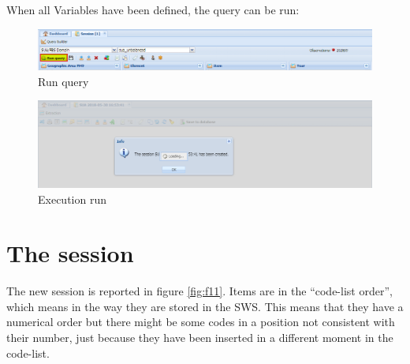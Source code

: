 \documentclass[]{article}
\begin{document}
When all Variables have been defined, the query can be run:

\begin{figure}[H]

{\centering \includegraphics[width=1\linewidth]{images/pullData/09_run} 

}

\caption{\label{fig:f9}Run query}\label{fig:f9}
\end{figure}

\begin{figure}[H]

{\centering \includegraphics[width=1\linewidth]{images/pullData/10_wait} 

}

\caption{\label{fig:f10}Execution run}\label{fig:f10}
\end{figure}

\section{The session}\label{the-session}

The new session is reported in figure \ref{fig:f11}. Items are in the
``code-list order'', which means in the way they are stored in the SWS.
This means that they have a numerical order but there might be some
codes in a position not consistent with their number, just because they
have been inserted in a different moment in the code-list.
\end{document}
